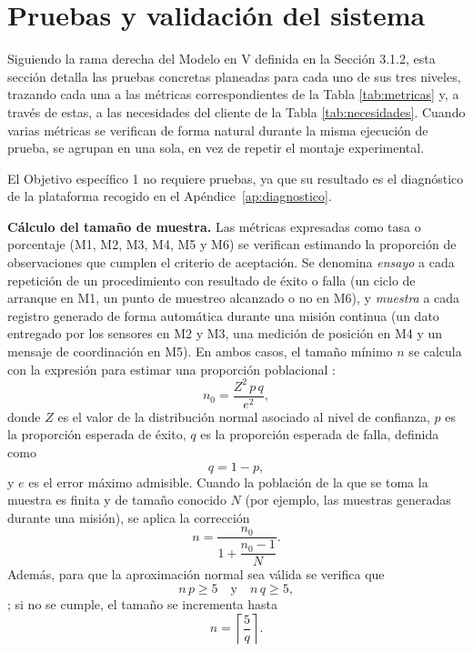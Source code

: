\newpage

\section{Pruebas y validación del sistema}
\label{sec:pruebas}
  
Siguiendo la rama derecha del Modelo en V definida en la Sección 3.1.2, esta sección detalla
las pruebas concretas planeadas para cada uno de sus tres niveles, trazando cada una a las
métricas correspondientes de la Tabla \ref{tab:metricas} y, a través de estas, a las necesidades del cliente
de la Tabla \ref{tab:necesidades}. Cuando varias métricas se verifican de forma natural durante la misma
ejecución de prueba, se agrupan en una sola, en vez de repetir el montaje experimental.

El Objetivo específico 1 no requiere pruebas, ya que su resultado es el diagnóstico de la plataforma 
recogido en el Apéndice~\ref{ap:diagnostico}.

\textbf{Cálculo del tamaño de muestra.} Las métricas expresadas como tasa o porcentaje
(M1, M2, M3, M4, M5 y M6) se verifican estimando la proporción de observaciones que
cumplen el criterio de aceptación. Se denomina \emph{ensayo} a cada repetición de un
procedimiento con resultado de éxito o falla (un ciclo de arranque en M1, un punto de
muestreo alcanzado o no en M6), y \emph{muestra} a cada registro generado de forma
automática durante una misión continua (un dato entregado por los sensores en M2 y M3, una
medición de posición en M4 y un mensaje de coordinación en M5). En ambos casos, el tamaño
mínimo $n$ se calcula con la expresión para estimar una proporción poblacional
\cite{Cite27,Cite28}:
\begin{equation}
  n_0 = \frac{Z^2\, p\, q}{e^2},
  \label{eq:cochran}
\end{equation}
donde $Z$ es el valor de la distribución normal asociado al nivel de confianza, $p$ es la
proporción esperada de éxito, $q$ es la proporción esperada de falla, definida como
\begin{equation}
  q = 1 - p,
  \label{eq:q}
\end{equation}
y $e$ es el error máximo admisible. Cuando la población de la que se toma la muestra es
finita y de tamaño conocido $N$ (por ejemplo, las muestras generadas durante una misión), se
aplica la corrección
\begin{equation}
  n = \frac{n_0}{1 + \dfrac{n_0 - 1}{N}}.
  \label{eq:fpc}
\end{equation}
Además, para que la aproximación normal sea válida se verifica que
\begin{equation}
  n\,p \geq 5 \quad \text{y} \quad n\,q \geq 5,
  \label{eq:normal}
\end{equation}
\cite{Cite28}; si no se cumple, el tamaño se incrementa hasta
\begin{equation}
  n = \left\lceil \frac{5}{q} \right\rceil.
  \label{eq:min}
\end{equation}

